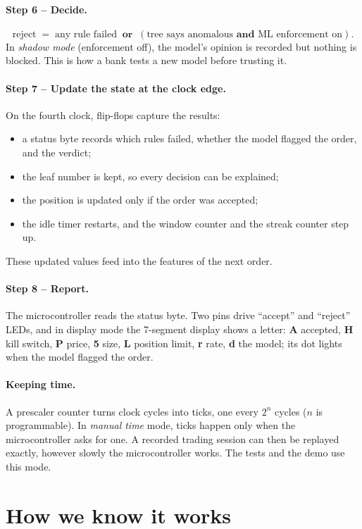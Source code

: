 \documentclass[11pt,a4paper]{article}
\newcommand{\step}[2]{\paragraph{Step #1 -- #2.}}
\begin{document}
\step{6}{Decide}
\[
\text{reject} \;=\; \text{any rule failed} \;\;\textbf{or}\;\; (\text{tree says anomalous} \textbf{ and } \text{ML enforcement on}).
\]
In \emph{shadow mode} (enforcement off), the model's opinion is recorded but nothing is blocked.
This is how a bank tests a new model before trusting it.

\step{7}{Update the state at the clock edge}
On the fourth clock, flip-flops capture the results:
\begin{itemize}
  \item a status byte records which rules failed, whether the model flagged the order, and the verdict;
  \item the leaf number is kept, so every decision can be explained;
  \item the position is updated only if the order was accepted;
  \item the idle timer restarts, and the window counter and the streak counter step up.
\end{itemize}
These updated values feed into the features of the next order.

\step{8}{Report}
The microcontroller reads the status byte. Two pins drive ``accept'' and ``reject'' LEDs, and in
display mode the 7-segment display shows a letter: \textbf{A} accepted, \textbf{H} kill switch,
\textbf{P} price, \textbf{5} size, \textbf{L} position limit, \textbf{r} rate, \textbf{d} the
model; its dot lights when the model flagged the order.

\paragraph{Keeping time.}
A prescaler counter turns clock cycles into ticks, one every $2^n$ cycles ($n$ is programmable).
In \emph{manual time} mode, ticks happen only when the microcontroller asks for one. A recorded
trading session can then be replayed exactly, however slowly the microcontroller works. The tests
and the demo use this mode.

\section{How we know it works}
\end{document}
